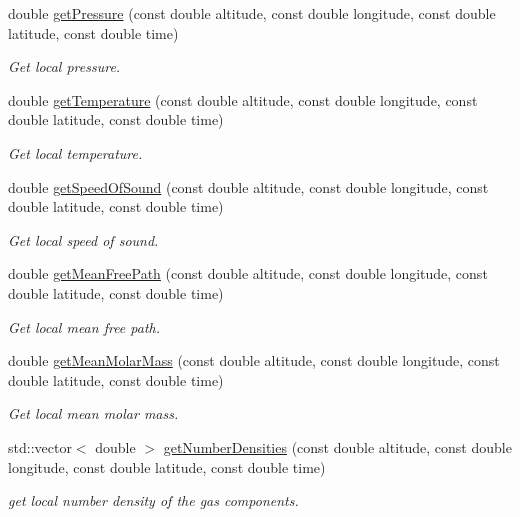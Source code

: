\begin{DoxyCompactItemize}
double \hyperlink{classtudat_1_1aerodynamics_1_1NRLMSISE00Atmosphere_afb3da940e795477c8f3fa112bf8dd5f5}{get\+Pressure} (const double altitude, const double longitude, const double latitude, const double time)
\begin{DoxyCompactList}\small\item\em Get local pressure. \end{DoxyCompactList}\item 
double \hyperlink{classtudat_1_1aerodynamics_1_1NRLMSISE00Atmosphere_a16b8b8363a3b7f6759cd764ba239d8bf}{get\+Temperature} (const double altitude, const double longitude, const double latitude, const double time)
\begin{DoxyCompactList}\small\item\em Get local temperature. \end{DoxyCompactList}\item 
double \hyperlink{classtudat_1_1aerodynamics_1_1NRLMSISE00Atmosphere_a494e42d0266f7d9fa0ebc45bf0f7d78d}{get\+Speed\+Of\+Sound} (const double altitude, const double longitude, const double latitude, const double time)
\begin{DoxyCompactList}\small\item\em Get local speed of sound. \end{DoxyCompactList}\item 
double \hyperlink{classtudat_1_1aerodynamics_1_1NRLMSISE00Atmosphere_a0e205f917f3c2f11b148a7a7f4f9bc07}{get\+Mean\+Free\+Path} (const double altitude, const double longitude, const double latitude, const double time)
\begin{DoxyCompactList}\small\item\em Get local mean free path. \end{DoxyCompactList}\item 
double \hyperlink{classtudat_1_1aerodynamics_1_1NRLMSISE00Atmosphere_ac187a49f5bdbfecb523200718b3cd443}{get\+Mean\+Molar\+Mass} (const double altitude, const double longitude, const double latitude, const double time)
\begin{DoxyCompactList}\small\item\em Get local mean molar mass. \end{DoxyCompactList}\item 
std\+::vector$<$ double $>$ \hyperlink{classtudat_1_1aerodynamics_1_1NRLMSISE00Atmosphere_a99b458d72a6953dca8de46f88a625df4}{get\+Number\+Densities} (const double altitude, const double longitude, const double latitude, const double time)
\begin{DoxyCompactList}\small\item\em get local number density of the gas components. \end{DoxyCompactList}\item 

\end{DoxyCompactItemize}
